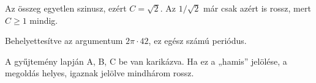 Az összeg egyetlen szinusz, ezért $C=\sqrt2$. Az $1/\sqrt2$ már csak azért is rossz, mert $C\ge1$ mindig.

\begin{center}\end{center}

Behelyettesítve az argumentum $2\pi\cdot42$, ez egész számú periódus.

\begin{center}\end{center}



\begin{center}\end{center}
\begin{figyelem}[Javítás]
A gyűjtemény lapján A, B, C be van karikázva. Ha ez a „hamis” jelölése, a megoldás helyes, igaznak jelölve mindhárom rossz.
\end{figyelem}
\begin{eredmeny}

\begin{center}\end{center}
\end{eredmeny}


